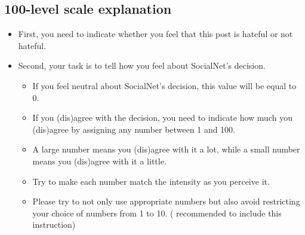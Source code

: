 \documentclass[a4paper]{article}
\begin{document}
\subsection{100-level scale explanation}
\begin{itemize}
    \item First, you need to indicate whether you feel that this post is hateful or not hateful.
    \item Second, your task is to tell how you feel about SocialNet's decision.
          \begin{itemize}
              \item If you feel neutral about SocialNet's decision, this value will be equal to 0.
              \item If you (dis)agree with the decision, you need to indicate how much you (dis)agree by assigning any number between 1 and 100.
              \item A large number means you (dis)agree with it a lot, while a small number means you (dis)agree with it a little.
              \item Try to make each number match the intensity as you perceive it.
              \item Please try to not only use appropriate numbers but also avoid restricting your choice of numbers from 1 to 10. (\cite{bard1996magnitude} recommended to include this instruction)
          \end{itemize}
\end{itemize}
\end{document}
